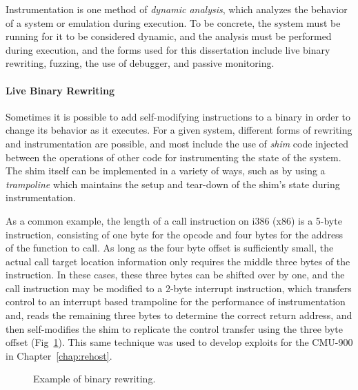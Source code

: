 Instrumentation is one method of \emph{dynamic analysis}, which analyzes the behavior of a system or emulation during execution.
To be concrete, the system must be running for it to be considered dynamic, and the analysis must be performed during execution, and the forms used for this dissertation include live binary rewriting, fuzzing, the use of debugger, and passive monitoring.

\paragraph{Live Binary Rewriting} Sometimes it is possible to add self-modifying instructions to a binary in order to change its behavior as it executes.
For a given system, different forms of rewriting and instrumentation are possible, and most include the use of \emph{shim} code injected between the operations of other code for instrumenting the state of the system.
The shim itself can be implemented in a variety of ways, such as by using a \emph{trampoline} which maintains the setup and tear-down of the shim's state during instrumentation.

As a common example, the length of a call instruction on i386 (x86) is a 5-byte instruction, consisting of one byte for the opcode and four bytes for the address of the function to call.
As long as the four byte offset is sufficiently small, the actual call target location information only requires the middle three bytes of the instruction.
In these cases, these three bytes can be shifted over by one, and the call instruction may be modified to a 2-byte interrupt instruction, which transfers control to an interrupt based trampoline for the performance of instrumentation and, reads the remaining three bytes to determine the correct return address, and then self-modifies the shim to replicate the control transfer using the three byte offset (Fig~\ref{fig:livebinaryrewriting}).
This same technique was used to develop exploits for the CMU-900 in Chapter~\ref{chap:rehost}.

\begin{figure}[h]
\centering
{}
\caption{Example of binary rewriting.}
\label{fig:livebinaryrewriting}
\end{figure}

